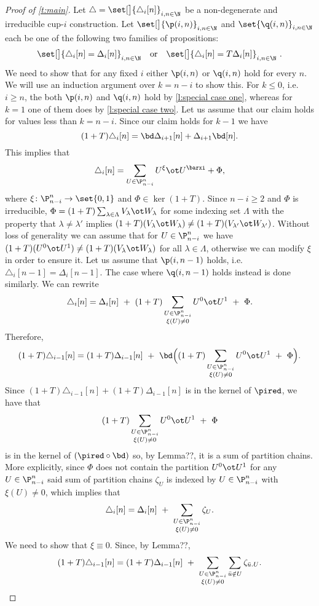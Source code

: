 \begin{proof}[Proof of \cref{t:main}]
	Let $\triangle = \set[\big]{\triangle_i [n]}_{i,n\in\N}$ be a non-degenerate and irreducible \mbox{cup-$i$} construction.
	Let $\set[\big]{\p(i,n)}_{i,n \in \N}$ and $\set{\q(i,n)}_{i,n \in \N}$ each be one of the following two families of propositions:
	\[
	\set[\big]{\triangle_i [n] = \Delta_ i [n]}_{i,n \in \N}
	\quad \text{or} \quad
	\set[\big]{\triangle_i [n] = T \Delta_ i [n]}_{i,n \in \N} \ .
	\]
	We need to show that for any fixed $i$ either $\p(i,n)$ or $\q(i,n)$ hold for every $n$.
	We will use an induction argument over $k = n-i$ to show this.
	For $k \leq 0$, i.e. $i \geq n$, the both $\p(i,n)$ and $\q(i,n)$ hold by \cref{l:special case one}, whereas for $k = 1$ one of them does by \cref{l:special case two}.
	Let us assume that our claim holds for values less than $k = n-i$.
	Since our claim holds for $k-1$ we have
	\[
	(1+T)\triangle_i[n] = \bd \Delta_{i+1}[n] + \Delta_{i+1} \bd [n].
	\]
	This implies that
	\[
	\triangle_i[n] = \sum_{U \in \P_{n-i}^n} U^{\xi} \ot U^{\barxi} + \Phi,
	\]
	where $\xi \colon \P_{n-i}^n \to \set{0,1}$ and $\Phi \in \ker(1+T)$.
	Since $n-i \geq 2$ and $\Phi$ is irreducible, $\Phi = (1+T) \sum_{\lambda \in \Lambda} V_\lambda \ot W_\lambda$ for some indexing set $\Lambda$ with the property that $\lambda \neq \lambda'$ implies $(1+T)(V_\lambda \ot W_\lambda) \neq (1+T)(V_{\lambda'} \ot W_{\lambda'})$.
	Without loss of generality we can assume that for $U \in \P_{n-i}^n$ we have $(1+T)(U^0 \ot U^1) \neq (1+T)(V_\lambda \ot W_\lambda)$ for all $\lambda \in \Lambda$, otherwise we can modify $\xi$ in order to ensure it.
	Let us assume that $\p(i,n-1)$ holds, i.e. $\triangle_i[n-1] = \Delta_i[n-1]$.
	The case where $\q(i,n-1)$ holds instead is done similarly.
	We can rewrite
	\[
	\triangle_i[n] = \Delta_i[n] \ +\
	(1+T) \sum_{\substack{U \in \P_{n-i}^n \\ \xi(U) \neq 0}} U^0 \ot U^1 \ +\
	\Phi.
	\]
	Therefore,
	\[
	(1+T)\triangle_{i-1}[n] = (1+T)\Delta_{i-1}[n] \ +\
	\bd\Big((1+T)\sum_{\substack{U \in \P_{n-i}^n \\ \xi(U) \neq 0}} U^0 \ot U^1 \ + \ \Phi \Big).
	\]
	Since $(1+T)\triangle_{i-1}[n] + (1+T)\Delta_{i-1}[n]$ is in the kernel of $\pired$, we have that
	\[
	(1+T)\sum_{\substack{U \in \P_{n-i}^n \\ \xi(U) \neq 0}} U^0 \ot U^1 \ + \ \Phi
	\]
	is in the kernel of $(\pired \circ \bd)$ so, by Lemma??, it is a sum of partition chains.
	More explicitly, since $\Phi$ does not contain the partition $U^0 \ot U^1$ for any $U \in \P_{n-i}^n$ said sum of partition chains $\zeta_U$ is indexed by $U \in \P_{n-i}^n$ with $\xi(U) \neq 0$,
	which implies that
	\[
	\triangle_i[n] = \Delta_i[n] \ +\ \sum_{\substack{U \in \P_{n-i}^n \\ \xi(U) \neq 0}} \zeta_U.
	\]
	We need to show that $\xi \equiv 0$.
	Since, by Lemma??,
	\[
	(1+T)\triangle_{i-1}[n] = (1+T)\Delta_{i-1}[n] \ +\
	\sum_{\substack{U \in \P_{n-i}^n \\ \xi(U) \neq 0}} \sum_{\bar u \notin U} \zeta_{\bar u.U}.
	\]


\end{proof}